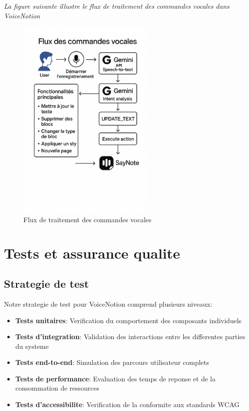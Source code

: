 \noindent
\textit{La figure suivante illustre le flux de traitement des commandes vocales dans VoiceNotion}
\begin{figure}[H]
\centering
\includegraphics[width=0.6\textwidth]{assets/docs/golobal-diagrams/flux-des-commende-vocal.png}
\caption{Flux de traitement des commandes vocales}
\label{fig:voice-commands-flow}
\end{figure}


\section{Tests et assurance qualite}
\subsection{Strategie de test}
Notre strategie de test pour VoiceNotion comprend plusieurs niveaux:
\begin{itemize}
    \item \textbf{Tests unitaires}: Verification du comportement des composants individuels
    \item \textbf{Tests d'integration}: Validation des interactions entre les differentes parties du systeme
    \item \textbf{Tests end-to-end}: Simulation des parcours utilisateur complets
    \item \textbf{Tests de performance}: Evaluation des temps de reponse et de la consommation de ressources
    \item \textbf{Tests d'accessibilite}: Verification de la conformite aux standards WCAG
\end{itemize}

